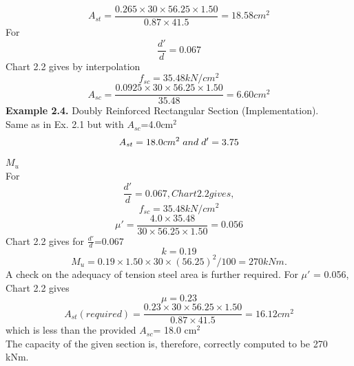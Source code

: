 \begin{equation*}
A_{st}=\frac{0.265 \times 30\times 56.25 \times 1.50}{0.87 \times 41.5}=18.58cm^2
\label{30}
\end{equation*}
For
\begin{equation*}
\frac{d'}{d}=0.067
\label{31}
\end{equation*}
Chart 2.2 gives by interpolation
\begin{equation*}
f_{sc}=35.48kN/cm^2
\label{32}
\end{equation*}
\begin{equation*}
A_{sc}=\frac{0.0925 \times 30 \times 56.25 \times 1.50}{35.48}=6.60cm^2
\label{32}
\end{equation*}
\textbf{Example 2.4.} Doubly Reinforced Rectangular Section (Implementation).\\
\given  Same as in Ex. 2.1 but with ${A_{sc}}$=4.0cm$^{2}$
\begin{equation*}
A_{st}=18.0cm^2 \hspace{0.1cm}and\hspace{0.1cm} d'=3.75
\label{33}
\end{equation*}
\required ${M_{u}}$\\
\solution For
\begin{equation*}
\frac{d'}{d}=0.067,Chart 2.2 gives,
\label{34}
\end{equation*}
\begin{equation*}
f_{sc}=35.48kN/cm^2
\label{35}
\end{equation*}
\begin{equation*}
\mu'=\frac{4.0 \times 35.48}{30 \times 56.25 \times 1.50}=0.056
\label{36}
\end{equation*}
Chart 2.2 gives for $\frac{d'}{d}$=0.067
\begin{equation*}
k=0.19
\label{37}
\end{equation*}
\begin{equation*}
M_u= 0.19 \times 1.50 \times 30 \times (56.25)^2/100=270kNm. 
\label{38}
\end{equation*}
A check on the adequacy of tension steel area is further required. For $\mu'$ = 0.056, Chart 2.2
gives
\begin{equation*}
\mu=0.23
\label{39}
\end{equation*}
\begin{equation*}
A_{st}(required)=\frac{0.23 \times 30 \times 56.25 \times 1.50}{0.87 \times 41.5}=16.12cm^2
\label{40}
\end{equation*}
which is less than the provided ${A_{sc}}$= 18.0 cm$^{2}$\\
The capacity of the given section is, therefore, correctly computed to be 270 kNm.
\newpage
